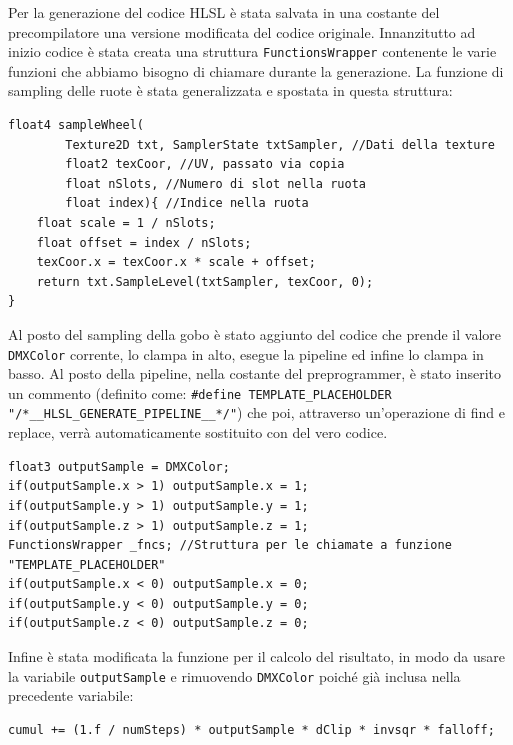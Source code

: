 \documentclass[main.tex]{subfiles}
\begin{document}
%
%

Per la generazione del codice HLSL è stata salvata in una costante del precompilatore una versione modificata del codice originale. Innanzitutto ad inizio codice è stata creata una struttura \lstinline{FunctionsWrapper} contenente le varie funzioni che abbiamo bisogno di chiamare durante la generazione. La funzione di sampling delle ruote è stata generalizzata e spostata in questa struttura:
\lstset{language=glsl}
\begin{lstlisting}
float4 sampleWheel(
        Texture2D txt, SamplerState txtSampler, //Dati della texture
        float2 texCoor, //UV, passato via copia
        float nSlots, //Numero di slot nella ruota
        float index){ //Indice nella ruota
    float scale = 1 / nSlots;
    float offset = index / nSlots;
    texCoor.x = texCoor.x * scale + offset;
    return txt.SampleLevel(txtSampler, texCoor, 0);
}
\end{lstlisting}
Al posto del sampling della gobo è stato aggiunto del codice che prende il valore \lstinline{DMXColor} corrente, lo clampa in alto, esegue la pipeline ed infine lo clampa in basso. Al posto della pipeline, nella costante del preprogrammer, è stato inserito un commento (definito come: \lstinline{#define TEMPLATE_PLACEHOLDER "/*__HLSL_GENERATE_PIPELINE__*/"}) che poi, attraverso un'operazione di find e replace, verrà automaticamente sostituito con del vero codice.
\begin{lstlisting}
float3 outputSample = DMXColor;
if(outputSample.x > 1) outputSample.x = 1;
if(outputSample.y > 1) outputSample.y = 1;
if(outputSample.z > 1) outputSample.z = 1;
FunctionsWrapper _fncs; //Struttura per le chiamate a funzione
"TEMPLATE_PLACEHOLDER"
if(outputSample.x < 0) outputSample.x = 0;
if(outputSample.y < 0) outputSample.y = 0;
if(outputSample.z < 0) outputSample.z = 0;
\end{lstlisting}
Infine è stata modificata la funzione per il calcolo del risultato, in modo da usare la variabile \lstinline{outputSample} e rimuovendo \lstinline{DMXColor} poiché già inclusa nella precedente variabile:
\begin{lstlisting}
cumul += (1.f / numSteps) * outputSample * dClip * invsqr * falloff;
\end{lstlisting}
\end{document}
